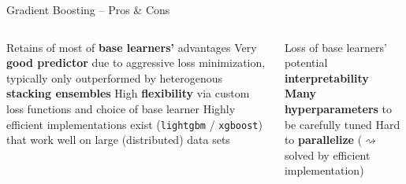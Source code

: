 \begin{frame}{Gradient Boosting -- Pros \& Cons}

\footnotesize

\begin{columns}[onlytextwidth]
  \begin{column}{0.5\textwidth}
    \footnotesize
    \begin{itemize}
      \positem Retains of most of \textbf{base learners'} advantages 
      \positem Very \textbf{good predictor} due to aggressive loss minimization, typically only outperformed by heterogenous \textbf{stacking ensembles}
      \positem High \textbf{flexibility} via custom loss functions and choice of base learner
      \positem Highly efficient implementations exist (\texttt{lightgbm} / \texttt{xgboost}) that work well on large (distributed) data sets
    \end{itemize}
  \end{column}
  \begin{column}{0.5\textwidth}
    \footnotesize
    \begin{itemize}
      \negitem Loss of base learners' potential \textbf{interpretability}
      \negitem \textbf{Many hyperparameters} 
      to be carefully tuned
      \negitem Hard to \textbf{parallelize} ($\rightsquigarrow$ solved by efficient implementation)
    \end{itemize}
  \end{column}
\end{columns}

\vfill

\small


\end{frame}